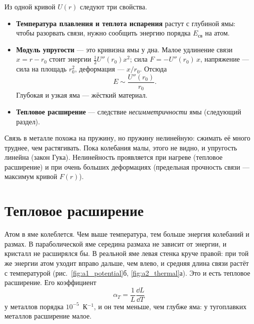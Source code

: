 
Из одной кривой $U(r)$ следуют три свойства.
\begin{itemize}
\item \textbf{Температура плавления и теплота испарения} растут с глубиной ямы: чтобы разорвать связи, нужно
  сообщить энергию порядка $E_{\text{св}}$ на атом.
\item \textbf{Модуль упругости} --- это кривизна ямы у дна. Малое удлинение связи $x = r - r_0$ стоит энергии
  $\tfrac12 U''(r_0)x^2$; сила $F = -U''(r_0)\,x$, напряжение --- сила на площадь $r_0^2$, деформация --- $x/r_0$.
  Отсюда
  \begin{equation}
  E \sim \frac{U''(r_0)}{r_0}.
  \end{equation}
  Глубокая и узкая яма --- жёсткий материал.
\item \textbf{Тепловое расширение} --- следствие \emph{несимметричности} ямы (следующий раздел).
\end{itemize}

\begin{idea}
Связь в металле похожа на пружину, но пружину нелинейную: сжимать её много труднее, чем растягивать. Пока
колебания малы, этого не видно, и упругость линейна (закон Гука). Нелинейность проявляется при нагреве (тепловое
расширение) и при очень больших деформациях (предельная прочность связи --- максимум кривой $F(r)$).
\end{idea}

\section{Тепловое расширение}

Атом в яме колеблется. Чем выше температура, тем больше энергия колебаний и размах. В параболической яме
середина размаха не зависит от энергии, и кристалл не расширялся бы. В реальной яме левая стенка круче правой:
при той же энергии атом уходит вправо дальше, чем влево, и средняя длина связи растёт с температурой
(рис.~\ref{fig:a1_potential}б, \ref{fig:a2_thermal}а). Это и есть тепловое расширение. Его коэффициент
\begin{equation}
\alpha_T = \frac{1}{L}\frac{\dd L}{\dd T}
\end{equation}
у металлов порядка $10^{-5}$~К$^{-1}$, и он тем меньше, чем глубже яма: у тугоплавких металлов расширение малое.

